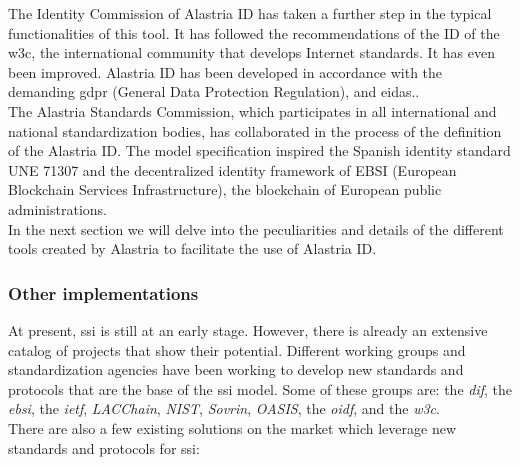 The Identity Commission of Alastria ID\cite{alastria-context} has taken a further step in the typical functionalities of this tool. It has followed the recommendations of the ID of the \acrfull{w3c}\cite{w3c}, the international community that develops Internet standards. It has even been improved. Alastria ID has been developed in accordance with the demanding \acrfull{gdpr}\cite{gdpr} (General Data Protection Regulation), and \acrfull{eidas}\cite{eidas}..\\

The Alastria Standards Commission, which participates in all international and national standardization bodies, has collaborated in the process of the definition of the Alastria ID. The model specification inspired the Spanish identity standard UNE 71307\cite{une-71307} and the decentralized identity framework of EBSI\cite{ebsi} (European Blockchain Services Infrastructure), the blockchain of European public administrations.\\

In the next section we will delve into the peculiarities and details of the different tools created by Alastria to facilitate the use of Alastria ID.

\subsubsection{Other implementations}
At present, \acrlong{ssi} is still at an early stage. However, there is already an extensive catalog of projects that show their potential. Different working groups and standardization agencies have been working to develop new standards and protocols that are the base of the \acrshort{ssi} model\cite{ssi-wallets}. Some of these groups are: the \textit{\acrfull{dif}}, the \textit{\acrfull{ebsi}}, the \textit{\acrfull{ietf}}, \textit{LACChain}, \textit{NIST}, \textit{Sovrin}, \textit{OASIS}, the \textit{\acrfull{oidf}}, and the \textit{\acrfull{w3c}}.\\

There are also a few existing solutions on the market which leverage new standards and protocols for \acrshort{ssi}:
